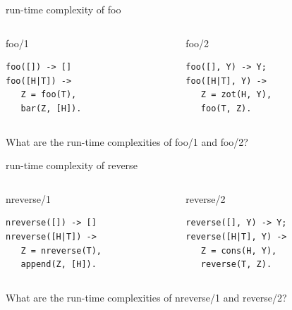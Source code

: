 \begin{frame}[fragile]{run-time complexity of foo}


\pause\vspace{20pt}
\begin{columns}
   \begin{column}{.5\linewidth}
     \begin{block}{foo/1}
       \begin{verbatim}
foo([]) -> []
foo([H|T]) -> 
   Z = foo(T),
   bar(Z, [H]).
       \end{verbatim}
      \end{block}
    \end{column}
\pause
    \begin{column}{.5\linewidth}
     \begin{block}{foo/2}
       \begin{verbatim}
foo([], Y) -> Y;
foo([H|T], Y) -> 
   Z = zot(H, Y),
   foo(T, Z).
       \end{verbatim}
      \end{block}
    \end{column}
  \end{columns}

\pause\vspace{20pt}
What are the run-time complexities of foo/1 and foo/2?

\end{frame}


\begin{frame}[fragile]{run-time complexity of reverse}

\pause\vspace{20pt}
\begin{columns}
   \begin{column}{.5\linewidth}
     \begin{block}{nreverse/1}
       \begin{verbatim}
nreverse([]) -> []
nreverse([H|T]) -> 
   Z = nreverse(T),
   append(Z, [H]).
       \end{verbatim}
      \end{block}
    \end{column}
\pause
    \begin{column}{.5\linewidth}
     \begin{block}{reverse/2}
       \begin{verbatim}
reverse([], Y) -> Y;
reverse([H|T], Y) -> 
   Z = cons(H, Y),
   reverse(T, Z).
       \end{verbatim}
      \end{block}
    \end{column}
  \end{columns}

\pause\vspace{20pt}
What are the run-time complexities of nreverse/1 and reverse/2?

\end{frame}


